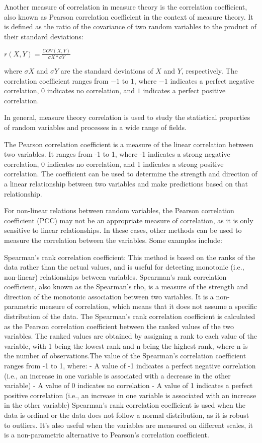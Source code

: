 \documentclass[12pt]{article} %
\theoremstyle{plain}
\begin{document}
	Another measure of correlation in measure theory is the correlation coefficient, also known as Pearson correlation coefficient in the context of measure theory. It is defined as the ratio of the covariance of two random variables to the product of their standard deviations:
	
	$r(X,Y) = \frac{COV(X,Y)} {\sigma{X} * \sigma{Y}}$
	
	where $\sigma{X}$ and $\sigma{Y}$ are the standard deviations of $X$ and $Y$, respectively. The correlation coefficient ranges from $-1$ to $1$, where $-1$ indicates a perfect negative correlation, $0$ indicates no correlation, and $1$ indicates a perfect positive correlation.
	
	In general, measure theory correlation is used to study the statistical properties of random variables and processes in a wide range of fields.
	
	The Pearson correlation coefficient is a measure of the linear correlation between two variables. It ranges from -1 to 1, where -1 indicates a strong negative correlation, 0 indicates no correlation, and 1 indicates a strong positive correlation. The coefficient can be used to determine the strength and direction of a linear relationship between two variables and make predictions based on that relationship.
	
	
	For non-linear relations between random variables, the Pearson correlation coefficient (PCC) may not be an appropriate measure of correlation, as it is only sensitive to linear relationships. In these cases, other methods can be used to measure the correlation between the variables. Some examples include:
	
	Spearman's rank correlation coefficient: This method is based on the ranks of the data rather than the actual values, and is useful for detecting monotonic (i.e., non-linear) relationships between variables. Spearman's rank correlation coefficient, also known as the Spearman's rho, is a measure of the strength and direction of the monotonic association between two variables. It is a non-parametric measure of correlation, which means that it does not assume a specific distribution of the data. The Spearman's rank correlation coefficient is calculated as the Pearson correlation coefficient between the ranked values of the two variables. The ranked values are obtained by assigning a rank to each value of the variable, with 1 being the lowest rank and n being the highest rank, where n is the number of observations.The value of the Spearman's correlation coefficient ranges from -1 to 1, where:
		- A value of -1 indicates a perfect negative correlation (i.e., an increase in one variable is associated with a decrease in the other variable)
		- A value of 0 indicates no correlation
		- A value of 1 indicates a perfect positive correlation (i.e., an increase in one variable is associated with an increase in the other variable)
	Spearman's rank correlation coefficient is used when the data is ordinal or the data does not follow a normal distribution, as it is robust to outliers. It's also useful when the variables are measured on different scales, it is a non-parametric alternative to Pearson's correlation coefficient.
	
\end{document}
